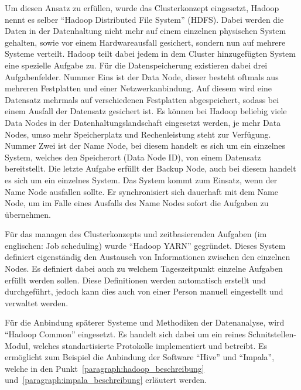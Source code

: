 Um diesen Ansatz zu erfüllen, wurde das Clusterkonzept eingesetzt, Hadoop nennt
es selber ``Hadoop Distributed File System'' (HDFS).  Dabei werden die Daten in
der Datenhaltung nicht mehr auf einem einzelnen physischen System gehalten,
sowie vor einem Hardwareausfall gesichert, sondern nun auf mehrere Systeme
verteilt. Hadoop teilt dabei jedem in dem Cluster hinzugefügten System eine
spezielle Aufgabe zu. Für die Datenspeicherung existieren dabei drei
Aufgabenfelder. Nummer Eins ist der Data Node, dieser besteht oftmals aus
mehreren Festplatten und einer Netzwerkanbindung. Auf diesem wird eine
Datensatz mehrmals auf verschiedenen Festplatten abgespeichert, sodass bei
einem Ausfall der Datensatz gesichert ist. Es können bei Hadoop beliebig viele
Data Nodes in der Datenhaltungslandschaft eingesetzt werden, je mehr Data
Nodes, umso mehr Speicherplatz und Rechenleistung steht zur Verfügung. Nummer
Zwei ist der Name Node, bei diesem handelt es sich um ein einzelnes System,
welches den Speicherort (Data Node ID), von einem Datensatz bereitstellt. Die
letzte Aufgabe erfüllt der Backup Node, auch bei diesem handelt es sich um ein
einzelnes System. Das System kommt zum Einsatz, wenn der Name Node ausfallen
sollte. Er synchronisiert sich dauerhaft mit dem Name Node, um im Falle eines
Ausfalls des Name Nodes sofort die Aufgaben zu übernehmen.

Für das managen des Clusterkonzepts und zeitbasierenden Aufgaben (im
englischen: Job scheduling) wurde ``Hadoop YARN'' gegründet. Dieses System
definiert eigenständig den Austausch von Informationen zwischen den einzelnen
Nodes. Es definiert dabei auch zu welchem Tageszeitpunkt einzelne Aufgaben
erfüllt werden sollen. Diese Definitionen werden automatisch erstellt und
durchgeführt, jedoch kann dies auch von einer Person manuell eingestellt und
verwaltet werden.

Für die Anbindung späterer Systeme und Methodiken der Datenanalyse, wird
``Hadoop Common'' eingesetzt. Es handelt sich dabei um ein reines
Schnitstellen-Modul, welches standartisierte Protokolle implementiert und
betreibt. Es ermöglicht zum Beispiel die Anbindung der Software ``Hive'' und
``Impala'', welche in den Punkt~\ref{paragraph:hadoop_beschreibung}
und~\ref{paragraph:impala_beschreibung} erläutert werden.

